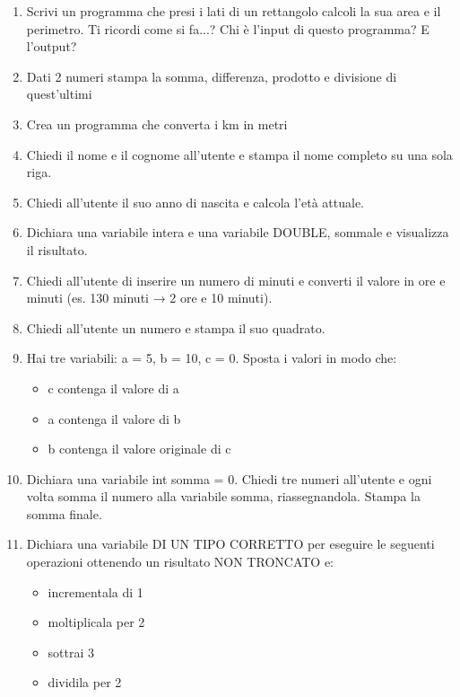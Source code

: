 \documentclass{article}
\begin{document}
\begin{enumerate}
    
    \item Scrivi un programma che presi i lati di un rettangolo calcoli la sua area e il perimetro. Ti ricordi come si fa...?
    Chi è l'input di questo programma? E l'output?

    \item Dati 2 numeri stampa la somma, differenza, prodotto e divisione di quest'ultimi
    
    \item Crea un programma che converta i km in metri 
    
    \item Chiedi il nome e il cognome all'utente e stampa il nome completo su una sola riga.
    
    \item Chiedi all'utente il suo anno di nascita e calcola l'età attuale.
    
    \item Dichiara una variabile intera e una variabile DOUBLE, sommale e visualizza il risultato.
    
    \item Chiedi all'utente di inserire un numero di minuti e converti il valore in ore e minuti (es. 130 minuti → 2 ore e 10 minuti).

    \item Chiedi all'utente un numero e stampa il suo quadrato.
    
    \item Hai tre variabili: a = 5, b = 10, c = 0. Sposta i valori in modo che:

    \begin{itemize}

        \item c contenga il valore di a
        \item a contenga il valore di b
        \item b contenga il valore originale di c

    \end{itemize}

    \item Dichiara una variabile int somma = 0. Chiedi tre numeri all'utente e ogni volta somma 
    il numero alla variabile somma, riassegnandola. Stampa la somma finale.

    \item Dichiara una variabile DI UN TIPO CORRETTO per eseguire le seguenti operazioni 
    ottenendo un risultato NON TRONCATO e:

    \begin{itemize}
        \item incrementala di 1
        \item moltiplicala per 2
        \item sottrai 3
        \item dividila per 2
    \end{itemize}

\end{enumerate}
\end{document}
